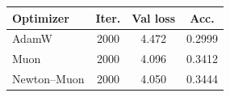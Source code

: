 \begin{tabular}{lccc}
\toprule
\textbf{Optimizer} & \textbf{Iter.} & \textbf{Val loss} & \textbf{Acc.} \\
\midrule
AdamW & 2000 & 4.472 & 0.2999 \\
Muon & 2000 & 4.096 & 0.3412 \\
Newton--Muon & 2000 & 4.050 & 0.3444 \\
\bottomrule
\end{tabular}
